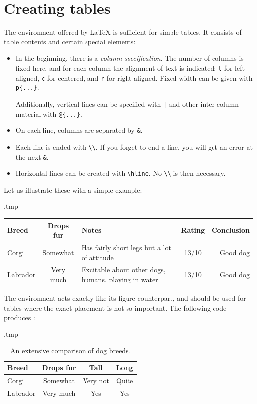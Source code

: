 



%
%
%
\section{Creating tables}

The  environment offered by \LaTeX{} is sufficient for simple tables.
It consists of table contents and certain special elements:
\begin{itemize}
\item In the beginning, there is a \emph{column specification}.
    The number of columns is fixed here, and for each column the alignment of text is indicated:
    \verb|l| for left-aligned, \verb|c| for centered, and \verb|r| for right-aligned.
    Fixed width can be given with \verb|p{...}|.

    Additionally, vertical lines can be specified with \verb+|+ and
    other inter-column material with \verb|@{...}|.
\item On each line, columns are separated by \verb|&|.
\item Each line is ended with \verb|\\|.
    If you forget to end a line, you will get an error at the next \verb|&|.
\item Horizontal lines can be created with \verb|\hline|.
    No \verb|\\| is then necessary.
\end{itemize}
%
Let us illustrate these with a simple example:
%
\begin{VerbatimOut}{\jobname.tmp}
\begin{tabular}{l| c p{3cm} c @{ $\Rightarrow$ } r}
Breed & Drops fur & Notes & Rating & Conclusion\\
\hline
Corgi & Somewhat & Has fairly short legs but a lot of attitude
    & 13/10 & Good dog\\
Labrador & Very much & Excitable about other dogs, humans, playing in water
    & 13/10 & Good dog
\end{tabular}
\end{VerbatimOut}
\ShowExampleBelow

The  environment acts exactly like its figure counterpart,
and should be used for tables where the exact placement is not so important.
The following code produces :
%
\begin{VerbatimOut}{\jobname.tmp}
\begin{table}[ht]
\centering
\begin{tabular}{l|ccc}
  Breed & Drops fur & Tall & Long\\
  \hline
  Corgi & Somewhat & Very not & Quite\\
  Labrador & Very much & Yes & Yes
\end{tabular}
\caption{An extensive comparison of dog breeds.}
\label{tbl:dogs}
\end{table}
\end{VerbatimOut}
\ExecuteExample


